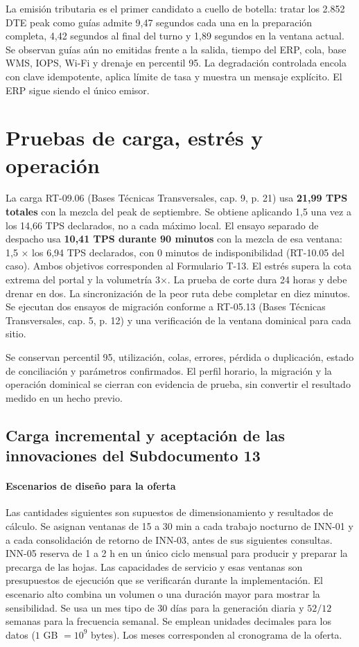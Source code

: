 La emisión tributaria es el primer candidato a cuello de botella: tratar los 2.852 DTE peak como guías admite 9,47 segundos cada una en la preparación completa, 4,42 segundos al final del turno y 1,89 segundos en la ventana actual. Se observan guías aún no emitidas frente a la salida, tiempo del ERP, cola, base WMS, IOPS, Wi-Fi y drenaje en percentil 95. La degradación controlada encola con clave idempotente, aplica límite de tasa y muestra un mensaje explícito. El ERP sigue siendo el único emisor.

\section{Pruebas de carga, estrés y operación}
\label{sec:anexo-4b-pruebas}

La carga RT-09.06 (Bases Técnicas Transversales, cap. 9, p. 21) usa \textbf{21,99 TPS totales} con la mezcla del peak de septiembre. Se obtiene aplicando 1,5 una vez a los 14,66 TPS declarados, no a cada máximo local. El ensayo separado de despacho usa \textbf{10,41 TPS durante 90 minutos} con la mezcla de esa ventana: 1,5 × los 6,94 TPS declarados, con 0 minutos de indisponibilidad (RT-10.05 del caso). Ambos objetivos corresponden al Formulario T-13. El estrés supera la cota extrema del portal y la volumetría 3×. La prueba de corte dura 24 horas y debe drenar en dos. La sincronización de la peor ruta debe completar en diez minutos. Se ejecutan dos ensayos de migración conforme a RT-05.13 (Bases Técnicas Transversales, cap. 5, p. 12) y una verificación de la ventana dominical para cada sitio.

Se conservan percentil 95, utilización, colas, errores, pérdida o duplicación, estado de conciliación y parámetros confirmados. El perfil horario, la migración y la operación dominical se cierran con evidencia de prueba, sin convertir el resultado medido en un hecho previo.

\subsection*{Carga incremental y aceptación de las innovaciones del Subdocumento 13}

\label{sec:anexo-4w-innovaciones}
\paragraph{Escenarios de diseño para la oferta}
Las cantidades siguientes son supuestos de dimensionamiento y resultados de cálculo. Se asignan ventanas de 15 a 30 min a cada trabajo nocturno de INN-01 y a cada consolidación de retorno de INN-03, antes de sus siguientes consultas. INN-05 reserva de 1 a 2 h en un único ciclo mensual para producir y preparar la precarga de las hojas. Las capacidades de servicio y esas ventanas son presupuestos de ejecución que se verificarán durante la implementación. El escenario alto combina un volumen o una duración mayor para mostrar la sensibilidad. Se usa un mes tipo de 30 días para la generación diaria y $52/12$ semanas para la frecuencia semanal. Se emplean unidades decimales para los datos ($1$ GB $=10^9$ bytes). Los meses corresponden al cronograma de la oferta.

